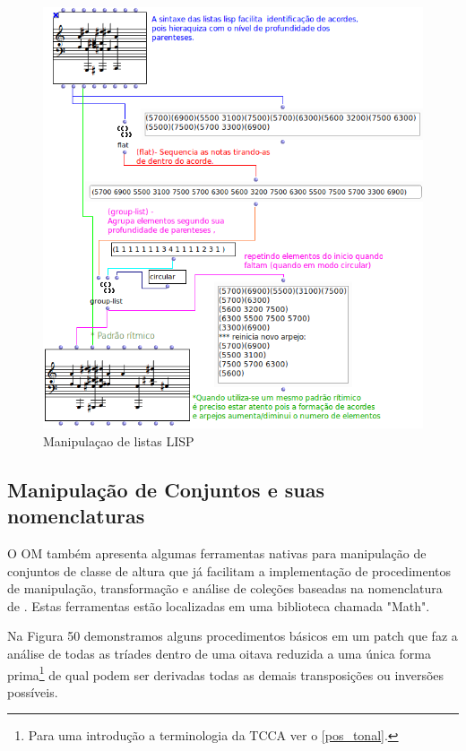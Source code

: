 \documentclass[
	12pt,				%
	openright,			%
	twoside,			%
	a4paper,			%
	english,			%
	french,				%
	spanish,			%
	brazil				%
	]{abntex2}
\begin{document}
\begin{figure}[!h]
	\caption{\label{fig_grafico}Manipulaçao de listas LISP }
	\begin{center}
	    \includegraphics[scale=0.6]{OMPD/manipulacao02.png}
	\end{center}
\end{figure}

\pagebreak
\subsection{Manipulação de Conjuntos e suas nomenclaturas}

O OM também apresenta algumas ferramentas nativas para manipulação de conjuntos de classe de altura que já facilitam a implementação de procedimentos de manipulação, transformação e análise de coleções baseadas na nomenclatura de . Estas ferramentas estão localizadas em uma biblioteca chamada "Math".

Na Figura 50 demonstramos alguns procedimentos básicos em um patch que faz a análise de todas as tríades dentro de uma oitava reduzida a uma única forma prima\footnote{Para uma introdução a terminologia da TCCA ver o \autoref{pos_tonal}. } de qual podem ser derivadas todas as demais transposições ou inversões possíveis.
\end{document}
